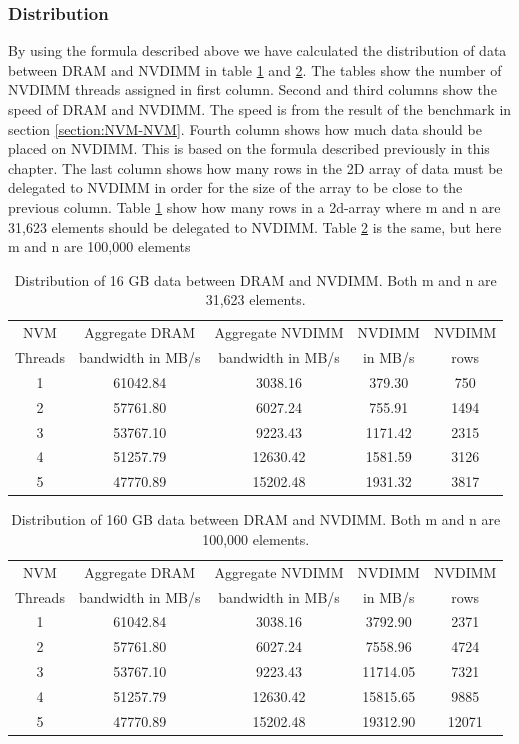 \documentclass[12pt,a4paper,USenglish]{article}      %
\begin{document}
\subsubsection{Distribution}
By using the formula described above we have calculated the distribution of data between DRAM and NVDIMM in table \ref{tab:distribution16GB} and \ref{tab:distribution160GB}. The tables show the number of NVDIMM threads assigned in first column. Second and third columns show the speed of DRAM and NVDIMM. The speed is from the result of the benchmark in section \ref{section:NVM-NVM}. Fourth column shows how much data should be placed on NVDIMM. This is based on the formula described previously in this chapter. The last column shows how many rows in the 2D array of data must be delegated to NVDIMM in order for the size of the array to be close to the previous column. Table \ref{tab:distribution16GB} show how many rows in a 2d-array where m and n are 31,623 elements should be delegated to NVDIMM. Table \ref{tab:distribution160GB} is the same, but here m and n are 100,000 elements

\begin{table}[!hbtp]
\centering
\begin{tabular}{ |c|c|c|c|c| } 
\hline
NVM & Aggregate DRAM  & Aggregate NVDIMM & NVDIMM & NVDIMM \\
Threads & bandwidth in MB/s & bandwidth in MB/s &in MB/s & rows \\
\hline
1 & 61042.84 & 3038.16 & 379.30 & 750 \\
\hline
2 & 57761.80 & 6027.24 & 755.91 & 1494 \\
\hline
3 & 53767.10 & 9223.43 & 1171.42 & 2315 \\
\hline
4 & 51257.79 & 12630.42 & 1581.59 & 3126 \\
\hline
5 & 47770.89 & 15202.48 & 1931.32 & 3817 \\
\hline
\end{tabular}
\caption{Distribution of 16 GB data between DRAM and NVDIMM. Both m and n are 31,623 elements.}
\label{tab:distribution16GB}
\end{table}

\begin{table}[!hbtp]
\centering
\begin{tabular}{ |c|c|c|c|c| } 
\hline
NVM & Aggregate DRAM  & Aggregate NVDIMM & NVDIMM & NVDIMM \\
Threads & bandwidth in MB/s & bandwidth in MB/s &in MB/s & rows \\
\hline
1 & 61042.84 & 3038.16 & 3792.90 & 2371 \\
\hline
2 & 57761.80 & 6027.24 & 7558.96 & 4724 \\
\hline
3 & 53767.10 & 9223.43 & 11714.05 & 7321 \\
\hline
4 & 51257.79 & 12630.42 & 15815.65 & 9885 \\
\hline
5 & 47770.89 & 15202.48 & 19312.90 & 12071 \\
\hline
\end{tabular}
\caption{Distribution of 160 GB data between DRAM and NVDIMM. Both m and n are 100,000 elements.}
\label{tab:distribution160GB}
\end{table}
\end{document}
